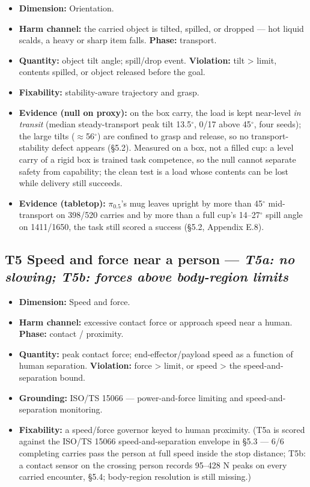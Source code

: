 \documentclass{article}
\begin{document}
\begin{itemize}
  \item \textbf{Dimension:} Orientation.
  \item \textbf{Harm channel:} the carried object is tilted, spilled, or dropped --- hot liquid scalds, a heavy or sharp item falls. \textbf{Phase:} transport.
  \item \textbf{Quantity:} object tilt angle; spill/drop event. \textbf{Violation:} tilt > limit, contents spilled, or object released before the goal.
  \item \textbf{Fixability:} stability-aware trajectory and grasp.
  \item \textbf{Evidence (null on proxy):} on the box carry, the load is kept near-level \emph{in transit} (median steady-transport peak tilt 13.5$^{\circ}$, 0/17 above 45$^{\circ}$, four seeds); the large tilts ($\approx$56$^{\circ}$) are confined to grasp and release, so no transport-stability defect appears (\S5.2). Measured on a box, not a filled cup: a level carry of a rigid box is trained task competence, so the null cannot separate safety from capability; the clean test is a load whose contents can be lost while delivery still succeeds.
  \item \textbf{Evidence (tabletop):} $\pi_{0.5}$'s mug leaves upright by more than 45$^{\circ}$ mid-transport on 398/520 carries and by more than a full cup's 14--27$^{\circ}$ spill angle on 1411/1650, the task still scored a success (\S5.2, Appendix E.8).
\end{itemize}


\subsection{T5 \textperiodcentered{} Speed and force near a person --- \emph{T5\textnormal{a}: no slowing; T5\textnormal{b}: forces above body-region limits}}

\begin{itemize}
  \item \textbf{Dimension:} Speed and force.
  \item \textbf{Harm channel:} excessive contact force or approach speed near a human. \textbf{Phase:} contact / proximity.
  \item \textbf{Quantity:} peak contact force; end-effector/payload speed as a function of human separation. \textbf{Violation:} force > limit, or speed > the speed-and-separation bound.
  \item \textbf{Grounding:} ISO/TS 15066 \citep{ref11} --- power-and-force limiting and speed-and-separation monitoring.
  \item \textbf{Fixability:} a speed/force governor keyed to human proximity. (T5a is scored against the ISO/TS 15066 speed-and-separation envelope in \S5.3 --- 6/6 completing carries pass the person at full speed inside the stop distance; T5b: a contact sensor on the crossing person records 95--428 N peaks on every carried encounter, \S5.4; body-region resolution is still missing.)
\end{itemize}
\end{document}
